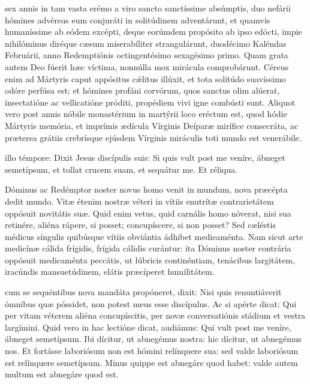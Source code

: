 \documentclass[fontsize=9pt,paper=A6,twoside,BCOR=1mm,DIV=22,headinclude]{scrarticle}
\begin{document}
\begin{multicols}{2}
\RVCv 

 sex annis in tam vasta erémo a viro sancto sanctíssime absúmptis, duo nefárii hómines advérsus eum conjuráti in solitúdinem adventárunt, et quamvis humaníssime ab eódem excépti, deque eorúmdem propósito ab ipso edócti, impie nihilóminus diréque cæsum miserabíliter strangulárunt, duodécimo Kaléndas Februárii, anno Redemptiónis octingentésimo sexagésimo primo. Quam grata autem Deo fúerit hæc víctima, nonnúlla mox mirácula comprobárunt. Céreus enim ad Mártyris caput appósitus c\'ælitus illúxit, et tota solitúdo suavíssimo odóre perfúsa est; et hómines profáni corvórum, quos sanctus olim alúerat, insectatióne ac vellicatióne próditi, propédiem vivi igne combústi sunt. Aliquot vero post annis nóbile monastérium in martýrii loco eréctum est, quod hódie Mártyris memória, et imprímis ædícula Vírginis Deíparæ mirífice consecráta, ac præterea grátiis crebrísque ejúsdem Vírginis miráculis toti mundo est venerábile.

\RVCvi 

 illo témpore: Dixit Jesus discípulis suis: Si quis vult post me veníre, ábneget semetípsum, et tollat crucem suam, et sequátur me. Et réliqua.

 Dóminus ac Redémptor noster novus homo venit in mundum, nova præcépta dedit mundo. Vitæ étenim nostræ véteri in vítiis enutrítæ contrarietátem oppósuit novitátis suæ. Quid enim vetus, quid carnális homo nóverat, nisi sua retinére, aliéna rápere, si posset; concupíscere, si non posset? Sed cæléstis médicus síngulis quibúsque vítiis obviántia ádhibet medicaménta. Nam sicut arte medicínæ cálida frígidis, frígida cálidis curántur: ita Dóminus noster contrária oppósuit medicaménta peccátis, ut lúbricis continéntiam, tenácibus largitátem, iracúndis mansuetúdinem, elátis præcíperet humilitátem.

\RVMvii

 cum se sequéntibus nova mandáta propóneret, dixit: Nisi quis renuntiáverit ómnibus quæ póssidet, non potest meus esse discípulus. Ac si apérte dicat: Qui per vitam véterem aliéna concupíscitis, per novæ conversatiónis stádium et vestra largímini. Quid vero in hac lectióne dicat, audiámus: Qui vult post me veníre, ábneget semetípsum. Ibi dícitur, ut abnegémus nostra: hic dícitur, ut abnegémus nos. Et fortásse laboriósum non est hómini relínquere sua: sed valde laboriósum est relínquere semetípsum. Minus quippe est abnegáre quod habet: valde autem multum est abnegáre quod est.


\end{multicols}
\end{document}
